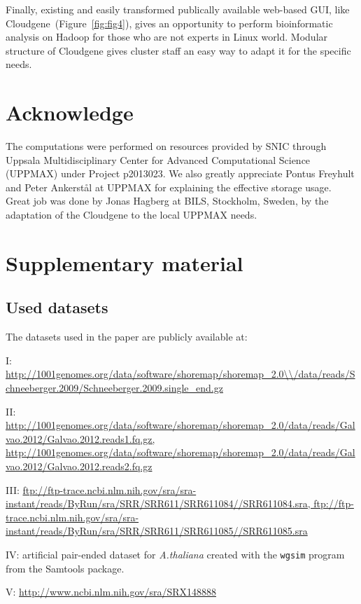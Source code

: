 \documentclass[11pt, oneside]{article}   	%
\begin{document}
Finally, existing and easily transformed publically available web-based GUI, like Cloudgene~(Figure~\ref{fig:fig4}),  gives an opportunity to perform bioinformatic analysis on Hadoop for those who are not experts in Linux world.  Modular structure of Cloudgene gives cluster staff an easy way to adapt it for the specific needs.



\section{Acknowledge}
The computations were performed on resources provided by SNIC through Uppsala Multidisciplinary Center for Advanced Computational Science (UPPMAX) under Project p2013023.
We also greatly appreciate   Pontus Freyhult and Peter Ankerst{\aa}l at  UPPMAX for explaining the effective storage usage. Great job was done by Jonas Hagberg at BILS, Stockholm, Sweden, by the adaptation of the Cloudgene to the local UPPMAX needs.



\section{Supplementary material}

\subsection{Used datasets}

The datasets used in the paper are publicly available at:

I: \url{http://1001genomes.org/data/software/shoremap/shoremap\_2.0\\/data/reads/Schneeberger.2009/Schneeberger.2009.single\_end.gz}

II: \url{http://1001genomes.org/data/software/shoremap/shoremap\_2.0/data/reads/Galvao.2012/Galvao.2012.reads1.fq.gz, http://1001genomes.org/data/software/shoremap/shoremap\_2.0/data/reads/Galvao.2012/Galvao.2012.reads2.fq.gz}	

III: \url{ftp://ftp-trace.ncbi.nlm.nih.gov/sra/sra-instant/reads/ByRun/sra/SRR/SRR611/SRR611084//SRR611084.sra, ftp://ftp-trace.ncbi.nlm.nih.gov/sra/sra-instant/reads/ByRun/sra/SRR/SRR611/SRR611085//SRR611085.sra}

IV: artificial pair-ended dataset for {\it A.thaliana} created with the {\tt wgsim} program from the Samtools package.

V: \url{http://www.ncbi.nlm.nih.gov/sra/SRX148888}
\end{document}
